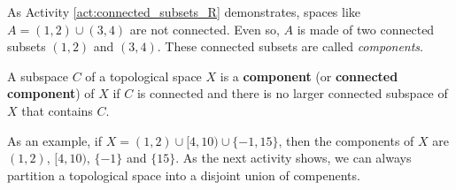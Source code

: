 \begin{comment}

\ActivitySolution

\ba
\item Suppose $U$ and $V$ form a separation of $A$. Then $U \cap A $ is not empty, so $ U \cap A = \{a\}$. Similarly, $V \cap A = \{a\}$. So $U \cap V \cap A = \{a\}$ isn't empty. This contradicts the assumption that $U$ and $V$ form a separation of $A$. We conclude that $A$ is connected.  

\item Let $U = (-\infty, c)$ and $V = (c, \infty)$. Since $c \notin A$, $A \subseteq (U \cup V)$. By definition, $A \cap U \cap V = \emptyset$, $A \cap U \neq \emptyset$, and $A \cap V \neq \emptyset$. So $U$ and $V$ form a separation of $A$ and $A$ is not connected. 

\item The connected subsets of $\R$ are the intervals and the single point sets. 

\ea

\end{comment}


As Activity \ref{act:connected_subsets_R} demonstrates, spaces like $A = (1,2) \cup (3,4)$ are not connected. Even so, $A$ is made of two connected subsets $(1,2)$ and $(3,4)$. These connected subsets are called \emph{components}.

\begin{definition} A subspace $C$ of a topological space $X$ is a \textbf{component} (or \textbf{connected component}) of $X$ if $C$ is connected and there is no larger connected subspace of $X$ that contains $C$.
\end{definition}

As an example, if $X = (1,2) \cup [4,10) \cup \{-1,15\}$, then the components of $X$ are $(1,2)$, $[4,10)$, $\{-1\}$ and $\{15\}$. As the next activity shows, we can always partition a topological space into a disjoint union of compenents.

